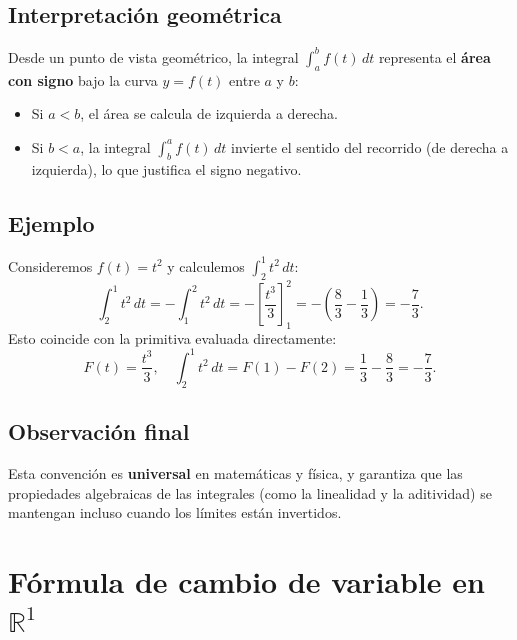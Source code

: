 \documentclass[12pt,a4paper]{article}
\begin{document}
\subsection{Interpretación geométrica}
Desde un punto de vista geométrico, la integral \(\int_a^b f(t) \, dt\) representa el \textbf{área con signo} bajo la curva \(y = f(t)\) entre \(a\) y \(b\):
\begin{itemize}
    \item Si \(a < b\), el área se calcula de izquierda a derecha.
    \item Si \(b < a\), la integral \(\int_b^a f(t) \, dt\) invierte el sentido del recorrido (de derecha a izquierda), lo que justifica el signo negativo.
\end{itemize}

\subsection{Ejemplo}
Consideremos \(f(t) = t^2\) y calculemos \(\int_2^1 t^2 \, dt\):
\[
\int_2^1 t^2 \, dt = - \int_1^2 t^2 \, dt = - \left[ \frac{t^3}{3} \right]_1^2 = - \left( \frac{8}{3} - \frac{1}{3} \right) = - \frac{7}{3}.
\]
Esto coincide con la primitiva evaluada directamente:
\[
F(t) = \frac{t^3}{3}, \quad \int_2^1 t^2 \, dt = F(1) - F(2) = \frac{1}{3} - \frac{8}{3} = - \frac{7}{3}.
\]

\subsection{Observación final}
Esta convención es \textbf{universal} en matemáticas y física, y garantiza que las propiedades algebraicas de las integrales (como la linealidad y la aditividad) se mantengan incluso cuando los límites están invertidos.



\section{Fórmula de cambio de variable en $\mathbb{R}^1$}
\end{document}
